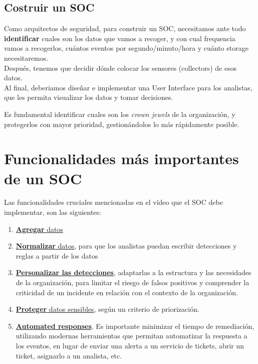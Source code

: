 \subsection{Costruir un SOC}
Como arquitectos de seguridad, para construir un SOC, necesitamos ante todo {\textbf{identificar} cuales son los datos que vamos a recoger, y con cual frequencia vamos a recogerlos}, cuántos eventos por segundo/minuto/hora y cuánto storage necesitaremos.\\
Después, tenemos que decidir dónde colocar los sensores (collectors) de esos datos.\\
Al final, deberiamos diseñar e implementar una User Interface para los analistas, que les permita visualizar los datos y tomar decisiones.

Es fundamental identificar {cuales son los \textit{crown jewels} de la organización}, y protegerlos con mayor prioridad, gestionándolos lo más rápidamente posible.


\section{Funcionalidades más importantes de un SOC}


{Las funcionalidades cruciales mencionadas en el vídeo que el SOC debe implementar, son las siguientes:\ns
\begin{enumerate}
   \item \ul{\textbf{Agregar} datos}
   \item \ul{\textbf{Normalizar} datos}, para que los analistas puedan escribir detecciones y reglas a partir de los datos
   \item \ul{\textbf{Personalizar las detecciones}}, adaptarlas a la estructura y las necesidades de la organización, para limitar el riesgo de falsos positivos y comprender la criticidad de un incidente en relación con el contexto de la organización.
   \item \ul{\textbf{Proteger} datos sensibles}, según un criterio de priorización.
   \item\ul{\textbf{Automated responses}}. Es importante minimizar el tiempo de remediación, utilizando modernas herramientas que permitan automatizar la respuesta a los eventos, en lugar de enviar una alerta a un servicio de tickets, abrir un ticket, asignarlo a un analista, etc. 
\end{enumerate}
}

